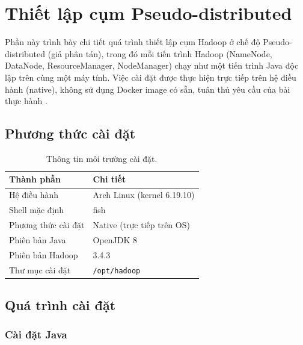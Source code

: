 \section{Thiết lập cụm Pseudo-distributed}
\label{sec:pseudo-distributed}


Phần này trình bày chi tiết quá trình thiết lập cụm Hadoop ở chế độ Pseudo-distributed (giả phân tán), trong đó mỗi tiến trình Hadoop (NameNode, DataNode, ResourceManager, NodeManager) chạy như một tiến trình Java độc lập trên cùng một máy tính. Việc cài đặt được thực hiện trực tiếp trên hệ điều hành (native), không sử dụng Docker image có sẵn, tuân thủ yêu cầu của bài thực hành \cite{white2012hadoop}.

\subsection{Phương thức cài đặt}

\begin{table}[H]
\centering
\caption{Thông tin môi trường cài đặt.}
\label{tab:env-info}
\begin{tabular}{ll}
\toprule
\textbf{Thành phần} & \textbf{Chi tiết} \\
\midrule
Hệ điều hành & Arch Linux (kernel 6.19.10) \\
Shell mặc định & fish \\
Phương thức cài đặt & Native (trực tiếp trên OS) \\
Phiên bản Java & OpenJDK 8 \\
Phiên bản Hadoop & 3.4.3 \\
Thư mục cài đặt & \texttt{/opt/hadoop} \\
\bottomrule
\end{tabular}
\end{table}


\subsection{Quá trình cài đặt}

\subsubsection{Cài đặt Java}

